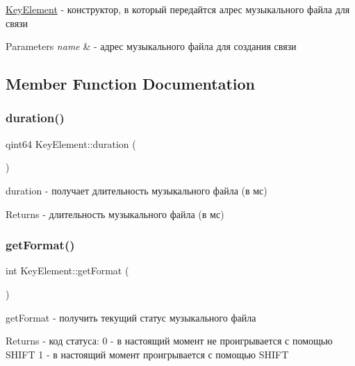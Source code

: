 \hyperlink{class_key_element}{Key\+Element} -\/ конструктор, в который передайтся алрес музыкального файла для связи 


\begin{DoxyParams}{Parameters}
{\em name} & -\/ адрес музыкального файла для создания связи \\
\hline
\end{DoxyParams}


\subsection{Member Function Documentation}
\mbox{\label{class_key_element_a30c837b84299e75fcd41e0c6544d86ad}} 
\subsubsection{\texorpdfstring{duration()}{duration()}}
{\footnotesize\ttfamily qint64 Key\+Element\+::duration (\begin{DoxyParamCaption}{ }\end{DoxyParamCaption})}



duration -\/ получает длительность музыкального файла (в мс) 

\begin{DoxyReturn}{Returns}
-\/ длительность музыкального файла (в мс) 
\end{DoxyReturn}
\mbox{\label{class_key_element_ab9a05ec48e81319c0f9648535bf448ef}} 
\subsubsection{\texorpdfstring{get\+Format()}{getFormat()}}
{\footnotesize\ttfamily int Key\+Element\+::get\+Format (\begin{DoxyParamCaption}{ }\end{DoxyParamCaption})}



get\+Format -\/ получить текущий статус музыкального файла 

\begin{DoxyReturn}{Returns}
-\/ код статуса\+: 0 -\/ в настоящий момент не проигрывается с помощью S\+H\+I\+FT 1 -\/ в настоящий момент проигрывается с помощью S\+H\+I\+FT 
\end{DoxyReturn}
\mbox{\label{class_key_element_aa4180885b87bb3eb0ed7418a96b79ffc}} 
